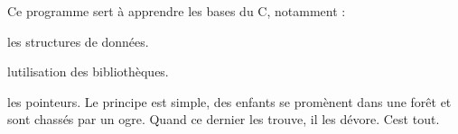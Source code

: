 Ce programme sert à apprendre les bases du C, notamment \+:
\begin{DoxyItemize}
\item les structures de données.
\item l\textquotesingle{}utilisation des bibliothèques.
\item les pointeurs. Le principe est simple, des enfants se promènent dans une forêt et sont chassés par un ogre. Quand ce dernier les trouve, il les dévore. C\textquotesingle{}est tout. 
\end{DoxyItemize}